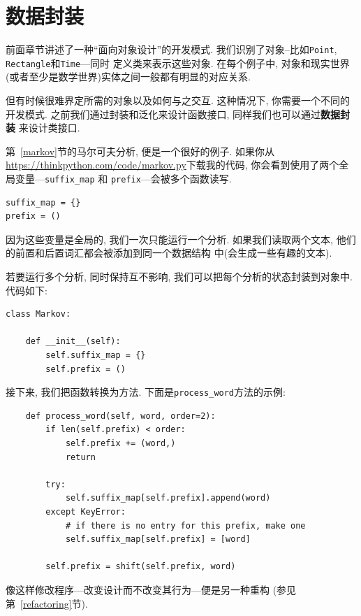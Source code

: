 \documentclass[10pt]{book}
\begin{document}
\section{数据封装}

前面章节讲述了一种``面向对象设计''的开发模式. 
我们识别了对象--比如{\tt Point}, {\tt Rectangle}和{\tt Time}---同时
定义类来表示这些对象. 
在每个例子中, 对象和现实世界(或者至少是数学世界)实体之间一般都有明显的对应关系. 

但有时候很难界定所需的对象以及如何与之交互. 
这种情况下, 你需要一个不同的开发模式. 
之前我们通过封装和泛化来设计函数接口, 同样我们也可以通过{\bf 数据封装}
来设计类接口. 

第~\ref{markov}节的马尔可夫分析, 便是一个很好的例子. 
如果你从\url{https://thinkpython.com/code/markov.py}下载我的代码, 
你会看到使用了两个全局变量---\verb"suffix_map" 和
\verb"prefix"---会被多个函数读写. 

\begin{verbatim}
suffix_map = {}        
prefix = ()            
\end{verbatim}

因为这些变量是全局的, 我们一次只能运行一个分析. 
如果我们读取两个文本, 他们的前置和后置词汇都会被添加到同一个数据结构
中(会生成一些有趣的文本). 

若要运行多个分析, 同时保持互不影响, 我们可以把每个分析的状态封装到对象中. 
代码如下:

\begin{verbatim}
class Markov:

    def __init__(self):
        self.suffix_map = {}
        self.prefix = ()    
\end{verbatim}

接下来, 我们把函数转换为方法. 
下面是\verb"process_word"方法的示例:

\begin{verbatim}
    def process_word(self, word, order=2):
        if len(self.prefix) < order:
            self.prefix += (word,)
            return

        try:
            self.suffix_map[self.prefix].append(word)
        except KeyError:
            # if there is no entry for this prefix, make one
            self.suffix_map[self.prefix] = [word]

        self.prefix = shift(self.prefix, word)        
\end{verbatim}
像这样修改程序---改变设计而不改变其行为---便是另一种重构
(参见第~\ref{refactoring}节).
\end{document}
